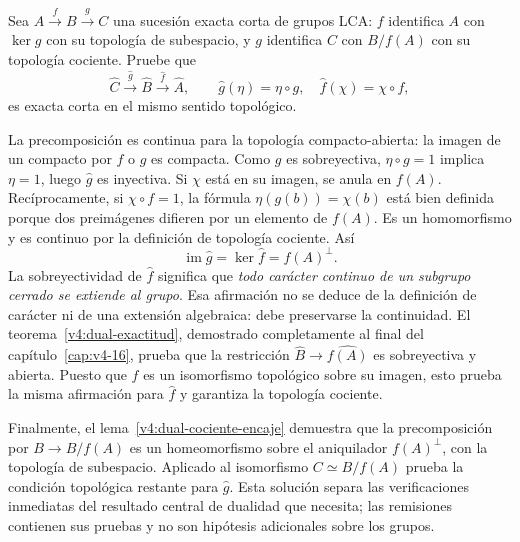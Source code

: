 \begin{ejercicio}\label{ej:v4-l25-2}
Sea $A\xrightarrow{f}B\xrightarrow{g}C$ una sucesión exacta corta de grupos LCA: $f$ identifica $A$ con $\ker g$ con su topología de subespacio, y $g$ identifica $C$ con $B/f(A)$ con su topología cociente. Pruebe que
\[
 \widehat C\xrightarrow{\widehat g}\widehat B
 \xrightarrow{\widehat f}\widehat A,
 \qquad \widehat g(\eta)=\eta\circ g,\quad
 \widehat f(\chi)=\chi\circ f,
\]
es exacta corta en el mismo sentido topológico.
\end{ejercicio}
\begin{solucion}
La precomposición es continua para la topología compacto-abierta: la imagen de un compacto por $f$ o $g$ es compacta. Como $g$ es sobreyectiva, $\eta\circ g=1$ implica $\eta=1$, luego $\widehat g$ es inyectiva. Si $\chi$ está en su imagen, se anula en $f(A)$. Recíprocamente, si $\chi\circ f=1$, la fórmula $\eta(g(b))=\chi(b)$ está bien definida porque dos preimágenes difieren por un elemento de $f(A)$. Es un homomorfismo y es continuo por la definición de topología cociente. Así
\[
 \operatorname{im}\widehat g=\ker\widehat f=f(A)^\perp.
\]
La sobreyectividad de $\widehat f$ significa que \emph{todo carácter continuo de un subgrupo cerrado se extiende al grupo}. Esa afirmación no se deduce de la definición de carácter ni de una extensión algebraica: debe preservarse la continuidad. El teorema~\ref{v4:dual-exactitud}, demostrado completamente al final del capítulo~\ref{cap:v4-16}, prueba que la restricción $\widehat B\to\widehat{f(A)}$ es sobreyectiva y abierta. Puesto que $f$ es un isomorfismo topológico sobre su imagen, esto prueba la misma afirmación para $\widehat f$ y garantiza la topología cociente.

Finalmente, el lema~\ref{v4:dual-cociente-encaje} demuestra que la precomposición por $B\to B/f(A)$ es un homeomorfismo sobre el aniquilador $f(A)^\perp$, con la topología de subespacio. Aplicado al isomorfismo $C\simeq B/f(A)$ prueba la condición topológica restante para $\widehat g$. Esta solución separa las verificaciones inmediatas del resultado central de dualidad que necesita; las remisiones contienen sus pruebas y no son hipótesis adicionales sobre los grupos.
\end{solucion}

